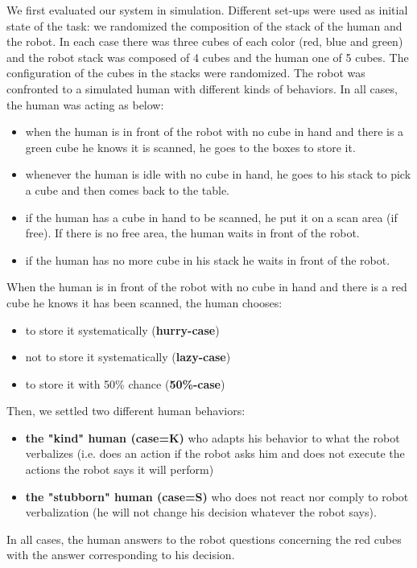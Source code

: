 \documentclass[english,a4paper,11pt,twoside]{StyleThese}
\begin{document}
We first evaluated our system in simulation. Different set-ups were used as initial state of the task: we randomized the composition of the stack of the human and the robot. In each case there was three cubes of each color (red, blue and green) and the robot stack was composed of 4 cubes and the human one of 5 cubes. The configuration of the cubes in the stacks were randomized. The robot was confronted to a simulated human with different kinds of behaviors. In all cases, the human was acting as below:
\begin{itemize}
\item when the human is in front of the robot with no cube in hand and there is a green cube he knows it is scanned, he goes to the boxes to store it.
\item whenever the human is idle with no cube in hand, he goes to his stack to pick a cube and then comes back to the table.
\item if the human has a cube in hand to be scanned, he put it on a scan area (if free). If there is no free area, the human waits in front of the robot.
\item if the human has no more cube in his stack he waits in front of the robot.
\end{itemize}
When the human is in front of the robot with no cube in hand and there is a red cube he knows it has been scanned, the human chooses:
\begin{itemize}
\item to store it systematically (\textbf{hurry-case})
\item not to store it systematically (\textbf{lazy-case})
\item to store it with 50\% chance (\textbf{50\%-case})
\end{itemize}
Then, we settled two different human behaviors:
\begin{itemize}
\item \textbf{the "kind" human (case=K)} who adapts his behavior to what the robot verbalizes (i.e. does an action if the robot asks him and does not execute the actions the robot says it will perform)
\item \textbf{the "stubborn" human (case=S)} who does not react nor comply to robot verbalization (he will not change his decision whatever the robot says).
\end{itemize}
In all cases, the human answers to the robot questions concerning the red cubes with the answer corresponding to his decision.
\end{document}
